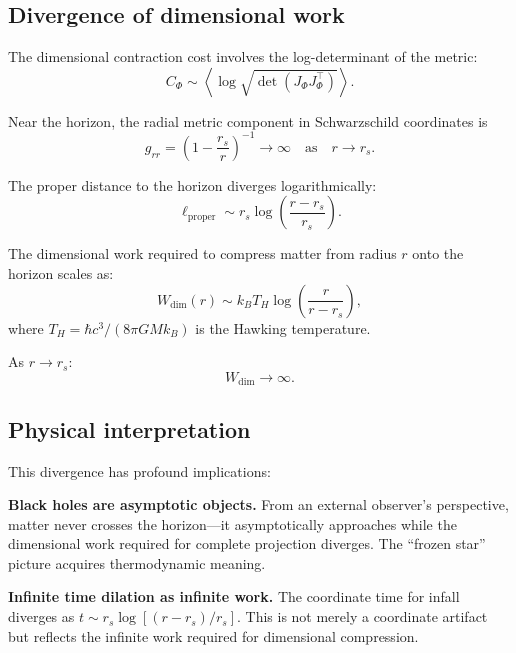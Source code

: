 \documentclass[aps,prd,twocolumn,superscriptaddress,floatfix]{revtex4-2}
\begin{document}
\subsection{Divergence of dimensional work}

The dimensional contraction cost involves the log-determinant of the metric:
\begin{equation}
C_\Phi \sim \left\langle \log\sqrt{\det(J_\Phi J_\Phi^\top)} \right\rangle.
\end{equation}

Near the horizon, the radial metric component in Schwarzschild coordinates is
\begin{equation}
g_{rr} = \left(1 - \frac{r_s}{r}\right)^{-1} \to \infty \quad \text{as} \quad r \to r_s.
\end{equation}

The proper distance to the horizon diverges logarithmically:
\begin{equation}
\ell_{\mathrm{proper}} \sim r_s \log\left(\frac{r - r_s}{r_s}\right).
\end{equation}

The dimensional work required to compress matter from radius $r$ onto the horizon scales as:
\begin{equation}
W_{\mathrm{dim}}(r) \sim k_B T_H \log\left(\frac{r}{r - r_s}\right),
\end{equation}
where $T_H = \hbar c^3 / (8\pi G M k_B)$ is the Hawking temperature.

As $r \to r_s$:
\begin{equation}
\boxed{W_{\mathrm{dim}} \to \infty.}
\end{equation}

\subsection{Physical interpretation}

This divergence has profound implications:

\textbf{Black holes are asymptotic objects.} From an external observer's perspective, matter never crosses the horizon---it asymptotically approaches while the dimensional work required for complete projection diverges. The ``frozen star'' picture acquires thermodynamic meaning.

\textbf{Infinite time dilation as infinite work.} The coordinate time for infall diverges as $t \sim r_s \log[(r-r_s)/r_s]$. This is not merely a coordinate artifact but reflects the infinite work required for dimensional compression.
\end{document}
